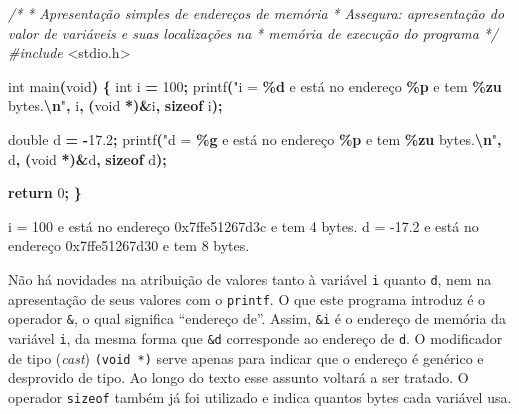 \documentclass[
  11pt,
  a4paper,
]{scrbook}
\newenvironment{Shaded}{\begin{snugshade}}{\end{snugshade}}
\newcommand{\CommentTok}[1]{\textcolor[rgb]{0.56,0.35,0.01}{\textit{#1}}}
\newcommand{\ControlFlowTok}[1]{\textcolor[rgb]{0.13,0.29,0.53}{\textbf{#1}}}
\newcommand{\DataTypeTok}[1]{\textcolor[rgb]{0.13,0.29,0.53}{#1}}
\newcommand{\DecValTok}[1]{\textcolor[rgb]{0.00,0.00,0.81}{#1}}
\newcommand{\FloatTok}[1]{\textcolor[rgb]{0.00,0.00,0.81}{#1}}
\newcommand{\ImportTok}[1]{#1}
\newcommand{\KeywordTok}[1]{\textcolor[rgb]{0.13,0.29,0.53}{\textbf{#1}}}
\newcommand{\NormalTok}[1]{#1}
\newcommand{\OperatorTok}[1]{\textcolor[rgb]{0.81,0.36,0.00}{\textbf{#1}}}
\newcommand{\PreprocessorTok}[1]{\textcolor[rgb]{0.56,0.35,0.01}{\textit{#1}}}
\newcommand{\SpecialCharTok}[1]{\textcolor[rgb]{0.81,0.36,0.00}{\textbf{#1}}}
\newcommand{\StringTok}[1]{\textcolor[rgb]{0.31,0.60,0.02}{#1}}
\begin{document}
\begin{Shaded}
\begin{Highlighting}[]
\CommentTok{/*}
\CommentTok{ * Apresentação simples de endereços de memória}
\CommentTok{ * Assegura: apresentação do valor de variáveis e suas localizações na}
\CommentTok{ *  memória de execução do programa}
\CommentTok{ */}
\PreprocessorTok{\#include }\ImportTok{\textless{}stdio.h\textgreater{}}

\DataTypeTok{int}\NormalTok{ main}\OperatorTok{(}\DataTypeTok{void}\OperatorTok{)} \OperatorTok{\{}
    \DataTypeTok{int}\NormalTok{ i }\OperatorTok{=} \DecValTok{100}\OperatorTok{;}
\NormalTok{    printf}\OperatorTok{(}\StringTok{"i = }\SpecialCharTok{\%d}\StringTok{ e está no endereço }\SpecialCharTok{\%p}\StringTok{ e tem }\SpecialCharTok{\%zu}\StringTok{ bytes.}\SpecialCharTok{\textbackslash{}n}\StringTok{"}\OperatorTok{,}\NormalTok{ i}\OperatorTok{,} \OperatorTok{(}\DataTypeTok{void} \OperatorTok{*)\&}\NormalTok{i}\OperatorTok{,}
           \KeywordTok{sizeof}\NormalTok{ i}\OperatorTok{);}

    \DataTypeTok{double}\NormalTok{ d }\OperatorTok{=} \OperatorTok{{-}}\FloatTok{17.2}\OperatorTok{;}
\NormalTok{    printf}\OperatorTok{(}\StringTok{"d = }\SpecialCharTok{\%g}\StringTok{ e está no endereço }\SpecialCharTok{\%p}\StringTok{ e tem }\SpecialCharTok{\%zu}\StringTok{ bytes.}\SpecialCharTok{\textbackslash{}n}\StringTok{"}\OperatorTok{,}\NormalTok{ d}\OperatorTok{,} \OperatorTok{(}\DataTypeTok{void} \OperatorTok{*)\&}\NormalTok{d}\OperatorTok{,}
           \KeywordTok{sizeof}\NormalTok{ d}\OperatorTok{);}

    \ControlFlowTok{return} \DecValTok{0}\OperatorTok{;}
\OperatorTok{\}}
\end{Highlighting}
\end{Shaded}

\begin{Shaded}
\begin{Highlighting}[]
\NormalTok{i = 100 e está no endereço 0x7ffe51267d3c e tem 4 bytes.}
\NormalTok{d = {-}17.2 e está no endereço 0x7ffe51267d30 e tem 8 bytes.}
\end{Highlighting}
\end{Shaded}

Não há novidades na atribuição de valores tanto à variável \texttt{i}
quanto \texttt{d}, nem na apresentação de seus valores com o
\texttt{printf}. O que este programa introduz é o operador \texttt{\&},
o qual significa ``endereço de''. Assim, \texttt{\&i} é o endereço de
memória da variável \texttt{i}, da mesma forma que \texttt{\&d}
corresponde ao endereço de \texttt{d}. O modificador de tipo
(\emph{cast}) \texttt{(void\ *)} serve apenas para indicar que o
endereço é genérico e desprovido de tipo. Ao longo do texto esse assunto
voltará a ser tratado. O operador \texttt{sizeof} também já foi
utilizado e indica quantos bytes cada variável usa.
\end{document}
